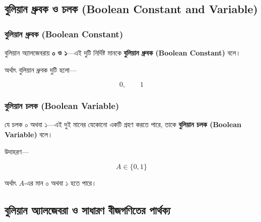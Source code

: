 
\subsection{বুলিয়ান ধ্রুবক ও চলক
(\textenglish{Boolean Constant and Variable})}

\subsubsection*{বুলিয়ান ধ্রুবক (\textenglish{Boolean Constant})}

\par\begingroup

বুলিয়ান অ্যালজেবরায় \textbf{০ ও ১}—এই দুটি নির্দিষ্ট মানকে
\textbf{বুলিয়ান ধ্রুবক
(\textenglish{Boolean Constant})} বলে।
\par\endgroup


অর্থাৎ বুলিয়ান ধ্রুবক দুটি হলো—

\[
0,\qquad 1
\]

\subsubsection*{বুলিয়ান চলক (\textenglish{Boolean Variable})}

\par\begingroup

যে চলক ০ অথবা ১—এই দুই মানের যেকোনো একটি গ্রহণ করতে পারে,
তাকে \textbf{বুলিয়ান চলক
(\textenglish{Boolean Variable})} বলে।
\par\endgroup


উদাহরণ—

\[
A\in\{0,1\}
\]

অর্থাৎ \(A\)-এর মান ০ অথবা ১ হতে পারে।


\subsection{বুলিয়ান অ্যালজেবরা ও সাধারণ বীজগণিতের পার্থক্য}

